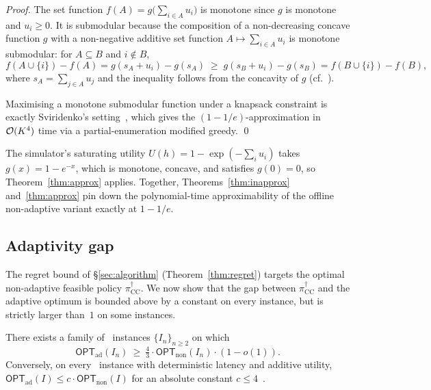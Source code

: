 \begin{proof}
The set function $f(A) = g\!\bigl(\sum_{i \in A} u_i\bigr)$ is monotone
since $g$ is monotone and $u_i \ge 0$. It is submodular because the
composition of a non-decreasing concave function $g$ with a
non-negative additive set function $A \mapsto \sum_{i \in A} u_i$ is
monotone submodular: for $A \subseteq B$ and $i \notin B$,
\[
  f(A \cup \{i\}) - f(A)
   = g(s_A + u_i) - g(s_A)
   \;\ge\; g(s_B + u_i) - g(s_B)
   = f(B \cup \{i\}) - f(B),
\]
where $s_A = \sum_{j \in A} u_j$ and the inequality follows from the
concavity of $g$ (cf.~\cite[Prop.~2.2.6]{nemhauser1978best}).

Maximising a monotone submodular function under a knapsack constraint
is exactly Sviridenko's setting~\cite{sviridenko2004}, which gives the
$(1-1/e)$-approximation in $\mathcal{O}(K^4)$ time via a partial-enumeration
modified greedy.
\qed
\end{proof}

\begin{remark}
The simulator's saturating utility $U(h) = 1 - \exp(-\sum_i u_i)$
takes $g(x) = 1 - e^{-x}$, which is monotone, concave, and satisfies
$g(0) = 0$, so Theorem~\ref{thm:approx} applies. Together,
Theorems~\ref{thm:inapprox} and~\ref{thm:approx} pin down the
polynomial-time approximability of the offline non-adaptive variant
exactly at $1 - 1/e$.
\end{remark}

\subsection{Adaptivity gap}

The regret bound of \S\ref{sec:algorithm} (Theorem~\ref{thm:regret})
targets the optimal non-adaptive feasible policy
$\pi^\dagger_{\mathrm{CC}}$. We now show that the gap between
$\pi^\dagger_{\mathrm{CC}}$ and the adaptive optimum is bounded above
by a constant on every instance, but is strictly larger than~$1$ on
some instances.

\begin{lemma}
\label{lem:adaptivity-gap}
There exists a family of \CBSLAO~instances $\{I_n\}_{n \ge 2}$ on which
\[
  \mathsf{OPT}_{\mathrm{ad}}(I_n)
   \ \ge\ \tfrac{4}{3} \cdot
       \mathsf{OPT}_{\mathrm{non}}(I_n) \cdot (1 - o(1)).
\]
Conversely, on every \CBSLAO~instance with deterministic latency and
additive utility, $\mathsf{OPT}_{\mathrm{ad}}(I) \le c \cdot
\mathsf{OPT}_{\mathrm{non}}(I)$ for an absolute constant
$c \le 4$~\cite{dean2008stochastic}.
\end{lemma}

